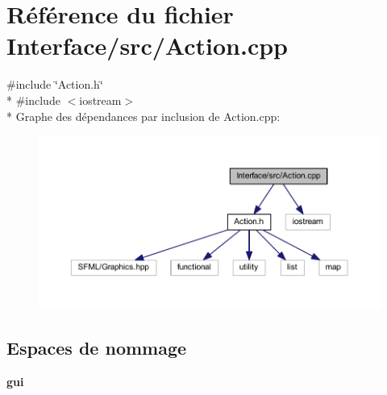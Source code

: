 \section{Référence du fichier Interface/src/\+Action.cpp}
\label{_action_8cpp}
{\ttfamily \#include \char`\"{}Action.\+h\char`\"{}}\\*
{\ttfamily \#include $<$iostream$>$}\\*
Graphe des dépendances par inclusion de Action.\+cpp\+:\nopagebreak
\begin{figure}[H]
\begin{center}
\leavevmode
\includegraphics[width=350pt]{_action_8cpp__incl}
\end{center}
\end{figure}
\subsection*{Espaces de nommage}
\begin{DoxyCompactItemize}
\item 
 {\bf gui}
\end{DoxyCompactItemize}
